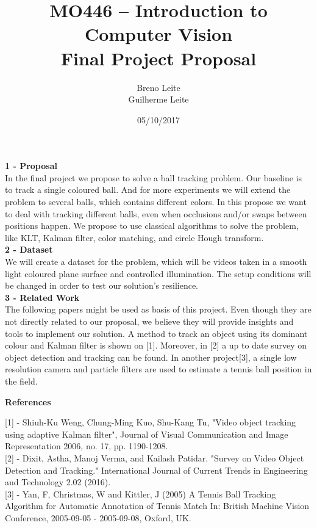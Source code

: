 \documentclass[12pt,a4paper]{article}
\title{MO446 -- Introduction to Computer Vision  \\ Final Project Proposal}
\author{Breno Leite  \\ Guilherme Leite}
\date{05/10/2017}
\begin{document}
\maketitle


\textbf{\LARGE 1 - Proposal} \\

	In the final project we propose to solve a ball tracking problem. Our baseline is to track a single coloured ball. And for more experiments we will extend the problem to several balls, which contains different colors. In this propose we want to deal with tracking different balls, even when occlusions and/or swaps between positions happen. We propose to use classical algorithms to solve the problem, like KLT, Kalman filter, color matching, and circle Hough transform. \\
	
\textbf{\LARGE 2 - Dataset} \\

	We will create a dataset for the problem, which will be videos taken in a smooth light coloured plane surface and controlled illumination. The setup conditions will be changed in order to test our solution's resilience.\\

\textbf{\LARGE 3 - Related Work} \\

	The following papers might be used as basis of this project. Even though they are not directly related to our proposal, we believe they will provide insights and tools to implement our solution.
	A method to track an object using its dominant colour and Kalman filter is shown on [1]. Moreover, in [2] a up to date survey on object detection and tracking can be found. In another project[3], a single low resolution camera and particle filters are used to estimate a tennis ball position in the field.\\
	
\newpage
	
\centerline{\textbf{\LARGE References}}

[1] - Shiuh-Ku Weng, Chung-Ming Kuo, Shu-Kang Tu, "Video object tracking using adaptive Kalman filter", Journal of Visual Communication and Image Representation 2006, no. 17, pp. 1190-1208. \\

[2] - Dixit, Astha, Manoj Verma, and Kailash Patidar. "Survey on Video Object Detection and Tracking." International Journal of Current Trends in Engineering and Technology 2.02 (2016). \\ 

[3] - Yan, F, Christmas, W and Kittler, J (2005) A Tennis Ball Tracking Algorithm for Automatic Annotation of Tennis Match In: British Machine Vision Conference, 2005-09-05 - 2005-09-08, Oxford, UK. \\
\end{document}
